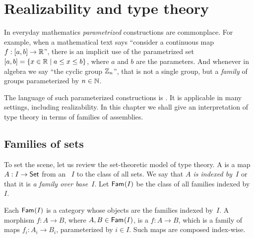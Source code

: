 \chapter{Realizability and type theory}
\label{cha:type-theory-real}

In everyday mathematics \emph{parametrized} constructions are commonplace. For
example, when a mathematical text says ``consider a continuous map $f
: [a,b] \to \mathbb{R}$'', there is an
implicit use of the parametrized set $[a,b] = \{x \in \mathbb{R} \mid a
  \leq x \leq b\}$, where $a$ and $b$ are the parameters. 
And whenever in algebra we say ``the cyclic group $\mathbb{Z}_n$'', that is not a single group, but a \emph{family} of groups parameterized by $n \in \mathbb{N}$.

The language of such parameterized constructions is . It is applicable in many settings, including realizability. In this chapter we shall give an interpretation of type theory in terms of families of assemblies.


\section{Families of sets}
\label{sec:families-sets}

To set the scene, let us review the set-theoretic model of type theory. A  is a map $A : I \to \mathsf{Set}$ from an ~$I$ to the class of all sets. We say that \emph{$A$ is indexed by~$I$} or that it is \emph{a family over base~$I$}. Let $\mathsf{Fam}_{}(I)$ be the class of all families indexed by~$I$.

Each $\mathsf{Fam}_{}(I)$ is a category whose objects are the families indexed by~$I$. A morphism $f : A \to B$, where $A, B \in \mathsf{Fam}_{}(I)$, is a  $f : A \to B$, which is a family of maps $f_i : A_i \to B_i$, parameterized by $i \in I$. Such maps are composed index-wise.

